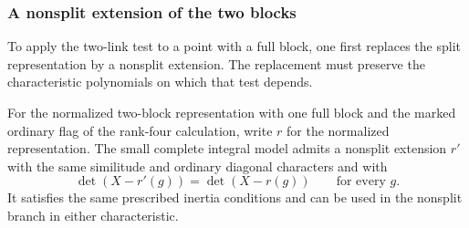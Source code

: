\subsubsection{A nonsplit extension of the two blocks}
\label{par:full-block-extension}
\hypertarget{source-cohomology-full-block-extension}{}

To apply the two-link test to a point with a full block, one first replaces the split representation by a nonsplit extension. The replacement must preserve the characteristic polynomials on which that test depends.

\begin{proposition}\label{prop:full-block-extension}
For the normalized two-block representation with one full block
and the marked ordinary flag of the rank-four calculation, write \(r\) for the normalized representation. The small complete integral model admits a nonsplit extension \(r'\) with the same similitude and ordinary diagonal characters and with 
\[
 \det(X-r'(g))=\det(X-r(g))\qquad\text{for every }g.
\]
 It satisfies the same prescribed inertia conditions
and can be used in the nonsplit branch in either characteristic.
\end{proposition}

